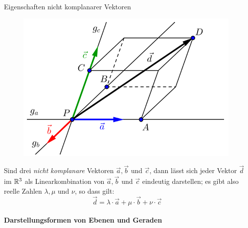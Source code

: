 \begin{theorem}{Eigenschaften nicht komplanarer Vektoren}\\
    \begin{figure}
        \vspace{-10pt}
        \includegraphics[width=\linewidth]{vec-nicht-kompl.png}
    \end{figure}
    Sind drei \textit{nicht komplanare} Vektoren $\vec{a}, \vec{b}$ und $\vec{c}$,
    dann lässt sich jeder Vektor $\vec{d}$ im $\mathbb{R}^3$ als Linearkombination von $\vec{a},\vec{b}$ und $\vec{c}$
    eindeutig darstellen;
    es gibt also reelle Zahlen $\lambda, \mu$ und $\nu$, so dass gilt:
    \begin{equation*}
        \vec{d}=\lambda\cdot\vec{a}+\mu\cdot\vec{b}+\nu\cdot\vec{c}
    \end{equation*}
\end{theorem}


\paragraph{Darstellungsformen von Ebenen und Geraden}

